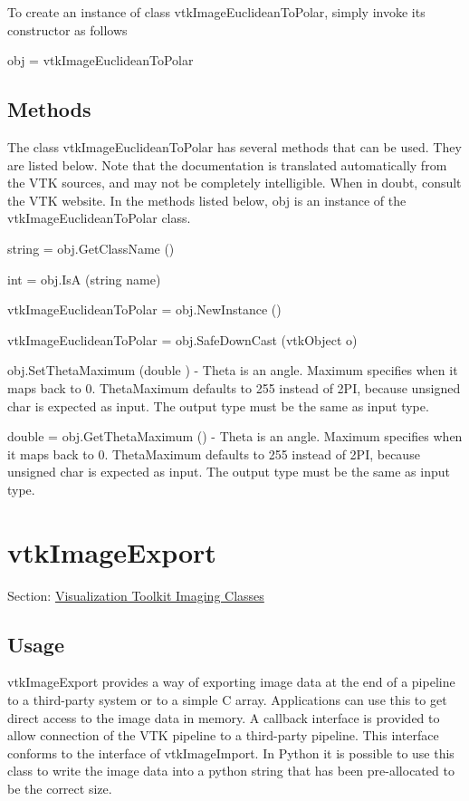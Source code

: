 To create an instance of class vtk\-Image\-Euclidean\-To\-Polar, simply invoke its constructor as follows \begin{DoxyVerb}  obj = vtkImageEuclideanToPolar
\end{DoxyVerb}
 \hypertarget{vtkwidgets_vtkxyplotwidget_Methods}{}\subsection{Methods}\label{vtkwidgets_vtkxyplotwidget_Methods}
The class vtk\-Image\-Euclidean\-To\-Polar has several methods that can be used. They are listed below. Note that the documentation is translated automatically from the V\-T\-K sources, and may not be completely intelligible. When in doubt, consult the V\-T\-K website. In the methods listed below, {\ttfamily obj} is an instance of the vtk\-Image\-Euclidean\-To\-Polar class. 
\begin{DoxyItemize}
\item {\ttfamily string = obj.\-Get\-Class\-Name ()}  
\item {\ttfamily int = obj.\-Is\-A (string name)}  
\item {\ttfamily vtk\-Image\-Euclidean\-To\-Polar = obj.\-New\-Instance ()}  
\item {\ttfamily vtk\-Image\-Euclidean\-To\-Polar = obj.\-Safe\-Down\-Cast (vtk\-Object o)}  
\item {\ttfamily obj.\-Set\-Theta\-Maximum (double )} -\/ Theta is an angle. Maximum specifies when it maps back to 0. Theta\-Maximum defaults to 255 instead of 2\-P\-I, because unsigned char is expected as input. The output type must be the same as input type.  
\item {\ttfamily double = obj.\-Get\-Theta\-Maximum ()} -\/ Theta is an angle. Maximum specifies when it maps back to 0. Theta\-Maximum defaults to 255 instead of 2\-P\-I, because unsigned char is expected as input. The output type must be the same as input type.  
\end{DoxyItemize}\hypertarget{vtkimaging_vtkimageexport}{}\section{vtk\-Image\-Export}\label{vtkimaging_vtkimageexport}
Section\-: \hyperlink{sec_vtkimaging}{Visualization Toolkit Imaging Classes} \hypertarget{vtkwidgets_vtkxyplotwidget_Usage}{}\subsection{Usage}\label{vtkwidgets_vtkxyplotwidget_Usage}
vtk\-Image\-Export provides a way of exporting image data at the end of a pipeline to a third-\/party system or to a simple C array. Applications can use this to get direct access to the image data in memory. A callback interface is provided to allow connection of the V\-T\-K pipeline to a third-\/party pipeline. This interface conforms to the interface of vtk\-Image\-Import. In Python it is possible to use this class to write the image data into a python string that has been pre-\/allocated to be the correct size.

